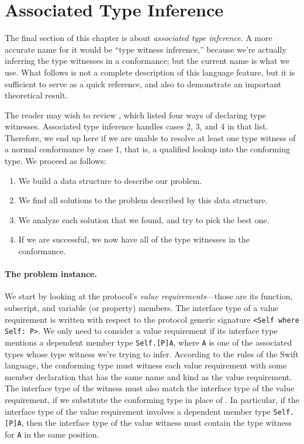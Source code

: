 \documentclass[../generics]{subfiles}
\begin{document}
\section{Associated Type Inference}\label{associated type inference}

The final section of this chapter is about \emph{associated type inference}. A more accurate name for it would be ``type witness inference,'' because we're actually inferring the type witnesses in a conformance; but the current name is what we use. What follows is not a complete description of this language feature, but it is sufficient to serve as a quick reference, and also to demonstrate an important theoretical result.

The reader may wish to review , which listed four ways of declaring type witnesses. Associated type inference handles cases 2, 3, and 4 in that list. Therefore, we end up here if we are unable to resolve at least one type witness of a normal conformance by case 1, that is, a qualified lookup into the conforming type. We proceed as follows:
\begin{enumerate}
\item We build a data structure to describe our problem.
\item We find all solutions to the problem described by this data structure.
\item We analyze each solution that we found, and try to pick the best one.
\item If we are successful, we now have all of the type witnesses in the conformance.
\end{enumerate}

\paragraph{The problem instance.}
We start by looking at the protocol's \emph{value requirements}---those are its function, subscript, and variable (or property) members. The interface type of a value requirement is written with respect to the protocol generic signature \verb|<Self where Self: P>|. We only need to consider a value requirement if its interface type mentions a dependent member type \texttt{Self.[P]A}, where \texttt{A} is one of the associated types whose type witness we're trying to infer. According to the rules of the Swift language, the conforming type must witness each value requirement with some member declaration that has the same name and kind as the value requirement. The interface type of the witness must also match the interface type of the value requirement, if we substitute the conforming type in place of \tSelf. In particular, if the interface type of the value requirement involves a dependent member type \texttt{Self.[P]A}, then the interface type of the value witness must contain the type witness for \texttt{A} in the same position.
\end{document}
